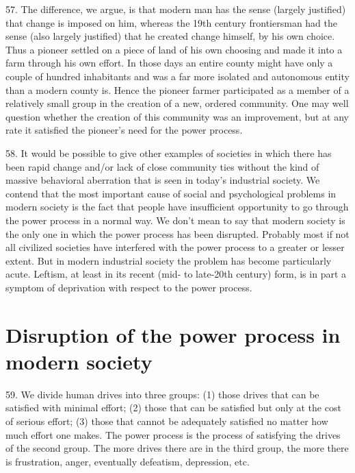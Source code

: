 \documentclass{article}
\begin{document}
57.  The difference, we argue, is that modern man has the sense (largely justified) that change is 
imposed on him, whereas the 19th century frontiersman had the sense (also largely justified) that 
he created change himself, by his own choice.  Thus a pioneer settled on a piece of land of his own 
choosing  and  made  it  into  a  farm  through  his  own  effort.   In  those  days  an  entire  county  might  
have only a couple of hundred inhabitants and was a far more isolated and autonomous entity than 
a modern county is.  Hence the pioneer farmer participated as a member of a relatively small group 
in the creation of a new, ordered community.  One may well question whether the creation of this 
community  was  an  improvement,  but  at  any  rate  it  satisfied  the  pioneer’s  need  for  the  power  
process. \vspace{\baselineskip}

58.  It would be possible to give other examples of societies in which there has been rapid change 
and/or lack of close community ties without the kind of massive behavioral aberration that is seen 
in today’s industrial society.  We contend that the most important cause of social and psychological 
problems in modern society is the fact that people have insufficient opportunity to go through the 
power  process  in  a  normal  way.   We  don’t  mean  to  say  that  modern  society  is  the  only  one  in  
which  the  power  process  has  been  disrupted.   Probably  most  if  not  all  civilized  societies  have  
interfered with the power process to a greater or lesser extent.  But in modern industrial society 
the problem has become particularly acute.  Leftism, at least in its recent (mid- to late-20th century) 
form, is in part a symptom of deprivation with respect to the power process. 


\section{Disruption of the power process in modern society}

\hspace{0.5cm} 59.  We divide human drives into three groups: (1) those drives that can be satisfied with minimal 
effort; (2) those that can be satisfied but only at the cost of serious effort; (3) those that cannot be 
adequately satisfied no matter how much effort one makes.  The power process is the process of 
satisfying the drives of the second group.  The more drives there are in the third group, the more 
there is frustration, anger, eventually defeatism, depression, etc. \vspace{\baselineskip}
\end{document}
